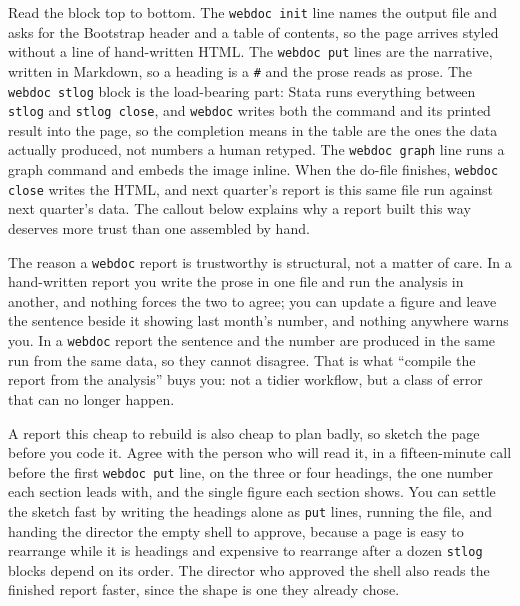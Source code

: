 Read the block top to bottom. The \texttt{webdoc init} line names the output file and asks for the Bootstrap header and a table of contents, so the page arrives styled without a line of hand-written HTML. The \texttt{webdoc put} lines are the narrative, written in Markdown, so a heading is a \texttt{\#} and the prose reads as prose. The \texttt{webdoc stlog} block is the load-bearing part: Stata runs everything between \texttt{stlog} and \texttt{stlog close}, and \texttt{webdoc} writes both the command and its printed result into the page, so the completion means in the table are the ones the data actually produced, not numbers a human retyped. The \texttt{webdoc graph} line runs a graph command and embeds the image inline. When the do-file finishes, \texttt{webdoc close} writes the HTML, and next quarter's report is this same file run against next quarter's data. The callout below explains why a report built this way deserves more trust than one assembled by hand.

\begin{vizcallout}
The reason a \texttt{webdoc} report is trustworthy is structural, not a matter of care. In a hand-written report you write the prose in one file and run the analysis in another, and nothing forces the two to agree; you can update a figure and leave the sentence beside it showing last month's number, and nothing anywhere warns you. In a \texttt{webdoc} report the sentence and the number are produced in the same run from the same data, so they cannot disagree. That is what \enquote{compile the report from the analysis} buys you: not a tidier workflow, but a class of error that can no longer happen.
\end{vizcallout}

A report this cheap to rebuild is also cheap to plan badly, so sketch the page before you code it. Agree with the person who will read it, in a fifteen-minute call before the first \texttt{webdoc put} line, on the three or four headings, the one number each section leads with, and the single figure each section shows. You can settle the sketch fast by writing the headings alone as \texttt{put} lines, running the file, and handing the director the empty shell to approve, because a page is easy to rearrange while it is headings and expensive to rearrange after a dozen \texttt{stlog} blocks depend on its order. The director who approved the shell also reads the finished report faster, since the shape is one they already chose.

